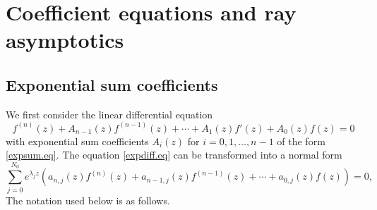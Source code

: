 \documentclass[a4paper,12pt]{article}
\numberwithin{equation}{section}
\begin{document}
\section{Coefficient equations and ray asymptotics}\label{Sec.result}
	\subsection{Exponential sum coefficients}

	We first consider the linear differential equation 
	 \begin{equation}\label{expdiff.eq}
		f^{(n)}(z)+A_{n-1}(z)f^{(n-1)}(z)+\cdots+A_1(z)f'(z)+A_0(z)f(z)=0
	\end{equation}
	with exponential sum coefficients $A_i(z)$ for $i=0,1,\ldots,n-1$ of the form \eqref{expsum.eq}. The equation \eqref{expdiff.eq} can be transformed into a normal form
	\begin{equation}\label{standard.eq}
		\sum_{j=0}^{N_0}e^{\lambda_j z}\left(a_{n,j}(z)f^{(n)}(z)+a_{n-1,j}(z)f^{(n-1)}(z)+\cdots +a_{0,j}(z)f(z)\right)=0,\quad 
	\end{equation}
The notation used below is as follows.
\end{document}
